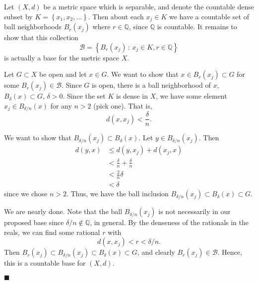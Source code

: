 \documentclass[12pt]{article}
\renewcommand{\qed}{\hfill$\blacksquare$}
\renewenvironment{proof}{\begin{addmargin}[1em]{0em}\begin{newproof}}{\end{newproof}\end{addmargin}\qed}
\begin{document}
\begin{proof}
	Let $\left(X,d\right)$ be a metric space which is separable, and denote the countable dense subset by $K = \left\{x_1,x_2,\ldots\right\}$. Then about each $x_j \in K$ we have a countable set of ball neighborhoods $B_r\left(x_j\right)$ where $r\in \mathbb{Q}$, since $\mathbb{Q}$ is countable. It remains to show that this collection $$ \mathcal{B} = \left\{ B_r\left(x_j\right) \, : \, x_j \in K, r\in \mathbb{Q}\right\}$$ is actually a base for the metric space $X$.
	
	Let $G\subset X$ be open and let $x\in G$. We want to show that $x \in B_r\left(x_j\right)\subset G$ for some $B_r\left(x_j\right) \in \mathcal{B}$. Since $G$ is open, there is a ball neighborhood of $x$, $B_{\delta}\left(x\right) \subset G$, $\delta > 0$. Since the set $K$ is dense in $X$, we have some element $x_j \in B_{\delta/n}\left(x\right)$ for any $n>2$ (pick one). That is, $$ d\left(x,x_j\right) < \frac{\delta}{n}. $$ 
	
	We want to show that $B_{\delta/n}\left(x_j\right) \subset B_{\delta}\left(x\right)$. Let $y \in B_{\delta/n} \left(x_j\right)$. Then
	\begin{align*}
		d\left(y,x\right) & \leq d\left(y,x_j\right) + d\left(x_j,x\right) \\
		& < \frac{\delta}{n} + \frac{\delta}{n} \\
		& < \frac{2}{n}\delta \\
		& < \delta
	\end{align*}
	since we chose $n>2$. Thus, we have the ball inclusion $B_{\delta/n}\left(x_j\right) \subset B_{\delta}\left(x\right) \subset G$.
	
	We are nearly done. Note that the ball $B_{\delta/n}\left(x_j\right)$ is not necessarily in our proposed base since $\delta/n \notin \mathbb{Q}$, in general. By the denseness of the rationals in the reals, we can find some rational $r$ with $$d\left(x,x_j\right)<r<\delta/n.$$ Then $B_r\left(x_j\right) \subset B_{\delta/n}\left(x_j\right) \subset B_{\delta}\left(x\right) \subset G$, and clearly $B_r\left(x_j\right) \in \mathcal{B}$. Hence, this is a countable base for $\left(X,d\right)$.
\end{proof}
\end{document}
